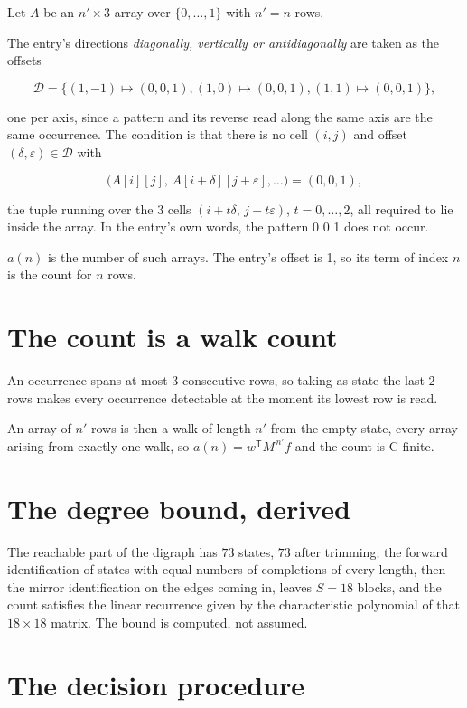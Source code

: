 \documentclass[11pt]{article}
\theoremstyle{definition}
\begin{document}
Let $A$ be an $n' \times 3$ array over $\{0,\dots,1\}$ with $n' = n$ rows.

The entry's directions {\itshape diagonally, vertically or antidiagonally} are taken as the offsets

\[\mathcal{D} = \{(1,-1)\mapsto(0,0,1), (1,0)\mapsto(0,0,1), (1,1)\mapsto(0,0,1)\},\]

one per axis, since a pattern and its reverse read along the same axis are the same occurrence. The condition is that there is no cell $(i,j)$ and offset $(\delta,\varepsilon)\in\mathcal{D}$ with

\[\bigl(A[i][j],\,A[i{+}\delta][j{+}\varepsilon],\dots\bigr) = (0, 0, 1),\]

the tuple running over the $3$ cells $(i+t\delta,\,j+t\varepsilon)$, $t = 0,\dots,2$, all required to lie inside the array. In the entry's own words, the pattern 0 0 1 does not occur.

$a(n)$ is the number of such arrays. The entry's offset is 1, so its term of index $n$ is the count for $n$ rows.

\section{The count is a walk count}

An occurrence spans at most $3$ consecutive rows, so taking as state the last $2$ rows makes every occurrence detectable at the moment its lowest row is read.

An array of $n'$ rows is then a walk of length $n'$ from the empty state, every array arising from exactly one walk, so $a(n) = w^{\mathsf T}M^{\,n'}f$ and the count is C-finite.

\section{The degree bound, derived}

The reachable part of the digraph has $73$ states, $73$ after trimming; the forward identification of states with equal numbers of completions of every length, then the mirror identification on the edges coming in, leaves $S = 18$ blocks, and the count satisfies the linear recurrence given by the characteristic polynomial of that $18\times18$ matrix. The bound is computed, not assumed.

\section{The decision procedure}
\end{document}
